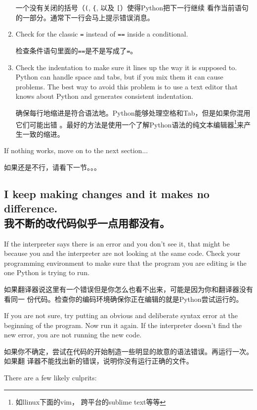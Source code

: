 \documentclass[10pt]{book}
\begin{document}
\begin{CJK}{UTF8}{gbsn}
\begin{enumerate}
  一个没有关闭的括号（\verb+(+, \verb+{+, 以及 \verb+[+）使得Python把下一行继续
          看作当前语句的一部分。通常下一行会马上提示错误消息。

\item Check for the classic {\tt =} instead of {\tt ==} inside
a conditional.

检查条件语句里面的{\tt ==}是不是写成了{\tt =}。

\item Check the indentation to make sure it lines up the way it
is supposed to.  Python can handle space and tabs, but if you mix
them it can cause problems.  The best way to avoid this problem
is to use a text editor that knows about Python and generates
consistent indentation.

确保每行地缩进是符合语法地。Python能够处理空格和Tab，但是如果你混用它们可能出错
。最好的方法是使用一个了解Python语法的纯文本编辑器\footnote{如llinux下面的vim，
跨平台的sublime text等等}来产生一致的缩进。

\end{enumerate}

If nothing works, move on to the next section...

如果还是不行，请看下一节。。。


\subsection{I keep making changes and it makes no difference. \\ 我不断的改代码似乎一点用都没有。}

If the interpreter says there is an error and you don't see it, that
might be because you and the interpreter are not looking at the same
code.  Check your programming environment to make sure that the
program you are editing is the one Python is trying to run.

如果翻译器说这里有一个错误但是你怎么也看不出来，可能是因为你和翻译器没有看同一
份代码。检查你的编码环境确保你正在编辑的就是Python尝试运行的。

If you are not sure, try putting an obvious and deliberate syntax
error at the beginning of the program.  Now run it again.  If the
interpreter doesn't find the new error, you are not running the
new code.

如果你不确定，尝试在代码的开始制造一些明显的故意的语法错误。再运行一次。如果翻
译器不能找出新的错误，说明你没有运行正确的文件。

There are a few likely culprits:


\end{CJK}
\end{document}
